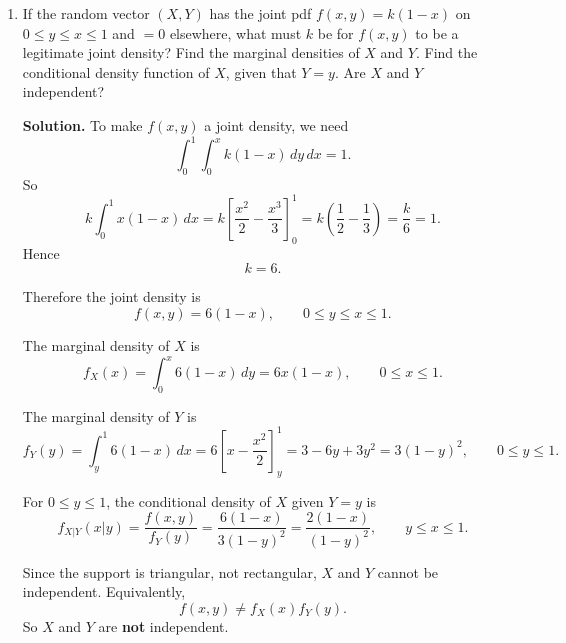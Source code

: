 \documentclass[12pt]{article}
\begin{document}
\begin{enumerate}[label=(\arabic*), leftmargin=*]
\par\medskip
\noindent\textbf{Solution.}
First rewrite the joint pdf as
\[
f(x,y)=\left(\frac14 xe^{-x/2}\right)\left(\frac1{16}y^2e^{-y/2}\right),
\qquad x>0,\ y>0.
\]
So $f(x,y)=f_X(x)f_Y(y)$, which shows that $X$ and $Y$ are independent.

The marginal pdf of $X$ is
\[
f_X(x)=\int_0^\infty \frac{1}{64}xy^2e^{-(x+y)/2}\,dy
=\frac14 xe^{-x/2},
\qquad x>0.
\]
Thus $X\sim \Gamma(2,2)$, so
\[
E(X)=2(2)=4,
\qquad
\operatorname{Var}(X)=2(2^2)=8.
\]

The marginal pdf of $Y$ is
\[
f_Y(y)=\int_0^\infty \frac{1}{64}xy^2e^{-(x+y)/2}\,dx
=\frac1{16}y^2e^{-y/2},
\qquad y>0.
\]
Thus $Y\sim \Gamma(3,2)$, so
\[
E(Y)=3(2)=6,
\qquad
\operatorname{Var}(Y)=3(2^2)=12.
\]

Since $X$ and $Y$ are independent,
\[
\operatorname{Corr}(X,Y)=0.
\]

Also,
\[
E(X^2Y^2)=E(X^2)E(Y^2).
\]
Now
\[
E(X^2)=\operatorname{Var}(X)+[E(X)]^2=8+4^2=24,
\]
and
\[
E(Y^2)=\operatorname{Var}(Y)+[E(Y)]^2=12+6^2=48.
\]
Therefore
\[
E(X^2Y^2)=24\cdot 48=1152.
\]

\item If the random vector $(X,Y)$ has the joint pdf $f(x,y)=k(1-x)$ on $0\le y\le x\le 1$ and $=0$ elsewhere, what must $k$ be for $f(x,y)$ to be a legitimate joint density? Find the marginal densities of $X$ and $Y$. Find the conditional density function of $X$, given that $Y=y$. Are $X$ and $Y$ independent?

\par\medskip
\noindent\textbf{Solution.}
To make $f(x,y)$ a joint density, we need
\[
\int_0^1\int_0^x k(1-x)\,dy\,dx=1.
\]
So
\[
k\int_0^1 x(1-x)\,dx
=k\left[\frac{x^2}{2}-\frac{x^3}{3}\right]_0^1
=k\left(\frac12-\frac13\right)
=\frac{k}{6}=1.
\]
Hence
\[
k=6.
\]

Therefore the joint density is
\[
f(x,y)=6(1-x),\qquad 0\le y\le x\le 1.
\]

The marginal density of $X$ is
\[
f_X(x)=\int_0^x 6(1-x)\,dy=6x(1-x),
\qquad 0\le x\le 1.
\]

The marginal density of $Y$ is
\[
f_Y(y)=\int_y^1 6(1-x)\,dx
=6\left[x-\frac{x^2}{2}\right]_y^1
=3-6y+3y^2
=3(1-y)^2,
\qquad 0\le y\le 1.
\]

For $0\le y\le 1$, the conditional density of $X$ given $Y=y$ is
\[
f_{X|Y}(x|y)=\frac{f(x,y)}{f_Y(y)}
=\frac{6(1-x)}{3(1-y)^2}
=\frac{2(1-x)}{(1-y)^2},
\qquad y\le x\le 1.
\]

Since the support is triangular, not rectangular, $X$ and $Y$ cannot be independent. Equivalently,
\[
f(x,y)\neq f_X(x)f_Y(y).
\]
So $X$ and $Y$ are \textbf{not} independent.


\end{enumerate}
\end{document}
